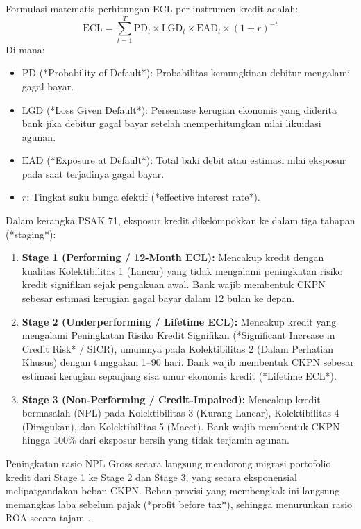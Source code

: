 \documentclass[12pt,a4paper]{article}
\numberwithin{equation}{section}
\begin{document}
\noindent
Formulasi matematis perhitungan ECL per instrumen kredit adalah:
\begin{equation}
  \text{ECL} = \sum_{t=1}^T \text{PD}_t \times \text{LGD}_t \times \text{EAD}_t \times (1 + r)^{-t}
\end{equation}
Di mana:
\begin{itemize}
  \item $\text{PD}$ (*Probability of Default*): Probabilitas kemungkinan debitur mengalami gagal bayar.
  \item $\text{LGD}$ (*Loss Given Default*): Persentase kerugian ekonomis yang diderita bank jika debitur gagal bayar setelah memperhitungkan nilai likuidasi agunan.
  \item $\text{EAD}$ (*Exposure at Default*): Total baki debit atau estimasi nilai eksposur pada saat terjadinya gagal bayar.
  \item $r$: Tingkat suku bunga efektif (*effective interest rate*).
\end{itemize}

\noindent
Dalam kerangka PSAK 71, eksposur kredit dikelompokkan ke dalam tiga tahapan (*staging*):
\begin{enumerate}
  \item \textbf{Stage 1 (Performing / 12-Month ECL):} Mencakup kredit dengan kualitas Kolektibilitas 1 (Lancar) yang tidak mengalami peningkatan risiko kredit signifikan sejak pengakuan awal. Bank wajib membentuk CKPN sebesar estimasi kerugian gagal bayar dalam 12 bulan ke depan.
  \item \textbf{Stage 2 (Underperforming / Lifetime ECL):} Mencakup kredit yang mengalami Peningkatan Risiko Kredit Signifikan (*Significant Increase in Credit Risk* / SICR), umumnya pada Kolektibilitas 2 (Dalam Perhatian Khusus) dengan tunggakan 1--90 hari. Bank wajib membentuk CKPN sebesar estimasi kerugian sepanjang sisa umur ekonomis kredit (*Lifetime ECL*).
  \item \textbf{Stage 3 (Non-Performing / Credit-Impaired):} Mencakup kredit bermasalah (NPL) pada Kolektibilitas 3 (Kurang Lancar), Kolektibilitas 4 (Diragukan), dan Kolektibilitas 5 (Macet). Bank wajib membentuk CKPN hingga 100\% dari eksposur bersih yang tidak terjamin agunan.
\end{enumerate}

\noindent
Peningkatan rasio NPL Gross secara langsung mendorong migrasi portofolio kredit dari Stage 1 ke Stage 2 dan Stage 3, yang secara eksponensial melipatgandakan beban CKPN. Beban provisi yang membengkak ini langsung memangkas laba sebelum pajak (*profit before tax*), sehingga menurunkan rasio ROA secara tajam \citep{KuncoroSuhardjono2018, PraditaSyaichu2022}.
\end{document}
